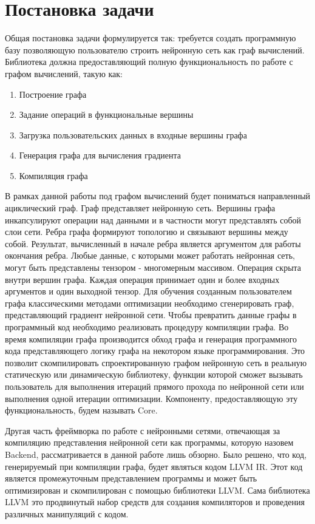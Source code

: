 \clearpage
\section{Постановка задачи}
Общая постановка задачи формулируется так: требуется создать программную базу позволяющую пользователю строить нейронную сеть как граф вычислений. Библиотека должна предоставляющий полную функциональность по работе с графом вычислений, такую как:
\begin{enumerate}
    \item Построение графа
    \item Задание операций в функциональные вершины
    \item Загрузка пользовательских данных в входные вершины графа
    \item Генерация графа для вычисления градиента
    \item Компиляция графа
\end{enumerate}
\par
В рамках данной работы под графом вычислений будет пониматься направленный ациклический граф. Граф представляет нейронную сеть. Вершины графа инкапсулируют операции над данными и в частности могут представлять собой слои сети. Ребра графа формируют топологию и связывают вершины между собой. Результат, вычисленный в начале ребра является аргументом для работы окончания ребра. Любые данные, с которыми может работать нейронная сеть, могут быть представлены тензором - многомерным массивом. Операция скрыта внутри вершин графа. Каждая операция принимает один и более входных аргументов и один выходной тензор. Для обучения созданным пользователем графа классическими методами оптимизации необходимо сгенерировать граф, представляющий градиент нейронной сети. Чтобы превратить данные графы в программный код необходимо реализовать процедуру компиляции графа. Во время компиляции графа производится обход графа и генерация программного кода представляющего логику графа на некотором языке программирования. Это позволит скомпилировать спроектированную графом нейронную сеть в реальную статическую или динамическую библиотеку, функции которой сможет вызывать пользователь для выполнения итераций прямого прохода по нейронной сети или выполнения одной итерации оптимизации. Компоненту, предоставляющую эту функциональность, будем называть Core.
\par
Другая часть фреймворка по работе с нейронными сетями, отвечающая за компиляцию представления нейронной сети как программы, которую назовем Backend, рассматривается в данной работе лишь обзорно. Было решено, что код, генерируемый при компиляции графа, будет являться кодом LLVM IR. Этот код является промежуточным представлением программы и может быть оптимизирован и скомпилирован с помощью библиотеки LLVM. Сама библиотека LLVM это продвинутый набор средств для создания компиляторов и проведения различных манипуляций с кодом.
